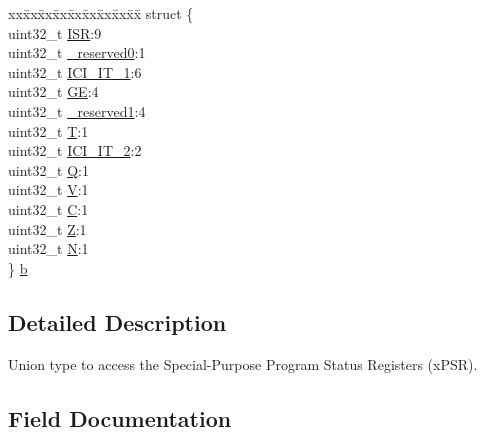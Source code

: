 \begin{DoxyCompactItemize}
\begin{tabbing}
\end{tabbing}\item 
\begin{tabbing}
xx\=xx\=xx\=xx\=xx\=xx\=xx\=xx\=xx\=\kill
struct \{\\
\>uint32\_t \mbox{\hyperlink{unionx_p_s_r___type_ad502ba7dbb2aab5f87c782b28f02622d}{ISR}}:9\\
\>uint32\_t \mbox{\hyperlink{unionx_p_s_r___type_ac8a6a13838a897c8d0b8bc991bbaf7c1}{\_reserved0}}:1\\
\>uint32\_t \mbox{\hyperlink{unionx_p_s_r___type_abedfacab5e6f9c329bfa0051cb88a9d3}{ICI\_IT\_1}}:6\\
\>uint32\_t \mbox{\hyperlink{unionx_p_s_r___type_aa91800ec6e90e457c7a1acd1f2e17099}{GE}}:4\\
\>uint32\_t \mbox{\hyperlink{unionx_p_s_r___type_a959a73d8faee56599b7e792a7c5a2d16}{\_reserved1}}:4\\
\>uint32\_t \mbox{\hyperlink{unionx_p_s_r___type_a6e1cf12e53a20224f6f62c001d9be972}{T}}:1\\
\>uint32\_t \mbox{\hyperlink{unionx_p_s_r___type_ae1df616880ca701154eba05e747605df}{ICI\_IT\_2}}:2\\
\>uint32\_t \mbox{\hyperlink{unionx_p_s_r___type_a65f27ddc4f7e09c14ce7c5211b2e000a}{Q}}:1\\
\>uint32\_t \mbox{\hyperlink{unionx_p_s_r___type_acd4a2b64faee91e4a9eef300667fa222}{V}}:1\\
\>uint32\_t \mbox{\hyperlink{unionx_p_s_r___type_a7a1caf92f32fe9ebd8d1fe89b06c7776}{C}}:1\\
\>uint32\_t \mbox{\hyperlink{unionx_p_s_r___type_a5ae954cbd9986cd64625d7fa00943c8e}{Z}}:1\\
\>uint32\_t \mbox{\hyperlink{unionx_p_s_r___type_abae0610bc2a97bbf7f689e953e0b451f}{N}}:1\\
\} \mbox{\hyperlink{unionx_p_s_r___type_a85dd6f43fa1330d08c40aa3ad534c012}{b}}\\

\end{tabbing}\end{DoxyCompactItemize}


\subsection{Detailed Description}
Union type to access the Special-\/\+Purpose Program Status Registers (x\+P\+SR). 

\subsection{Field Documentation}
\mbox{\label{unionx_p_s_r___type_ac8a6a13838a897c8d0b8bc991bbaf7c1}} 
